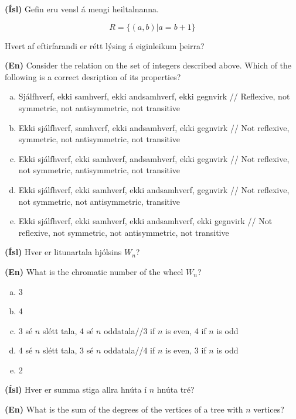 \documentclass[addpoints]{exam}
\begin{document}
\begin{questions}
\question[3] 

\textbf{(Ísl)} Gefin eru vensl á mengi heiltalnanna.

\[
    R = \{(a,b)|a=b+1\}
\]

Hvert af eftirfarandi er rétt lýsing á eiginleikum þeirra?

\textbf{(En)} Consider the relation on the set of integers described above. Which of the following is a correct desription of its properties?

\begin{enumerate}[a)]
    \item Sjálfhverf, ekki samhverf, ekki andsamhverf, ekki gegnvirk // Reflexive, not symmetric, not antisymmetric, not transitive    
    \item Ekki sjálfhverf, samhverf, ekki andsamhverf, ekki gegnvirk // Not reflexive, symmetric, not antisymmetric, not transitive
    \item Ekki sjálfhverf, ekki samhverf, andsamhverf, ekki gegnvirk // Not reflexive, not symmetric, antisymmetric, not transitive %
    \item Ekki sjálfhverf, ekki samhverf, ekki andsamhverf, gegnvirk // Not reflexive, not symmetric, not antisymmetric, transitive
    \item Ekki sjálfhverf, ekki samhverf, ekki andsamhverf, ekki gegnvirk // Not reflexive, not symmetric, not antisymmetric, not transitive
\end{enumerate}

\question[3] 

\textbf{(Ísl)} Hver er litunartala hjólsins $W_n$?

\textbf{(En)} What is the chromatic number of the wheel $W_n$?

\begin{enumerate}[a)]
    \item 3
    \item 4
    \item 3 sé $n$ slétt tala, 4 sé $n$ oddatala//3 if $n$ is even, 4 if $n$ is odd %
    \item 4 sé $n$ slétt tala, 3 sé $n$ oddatala//4 if $n$ is even, 3 if $n$ is odd
    \item 2
\end{enumerate}

\newpage

\question[3]

\textbf{(Ísl)} Hver er summa stiga allra hnúta í $n$ hnúta tré?

\textbf{(En)} What is the sum of the degrees of the vertices of a tree with $n$ vertices?


\end{questions}
\end{document}
